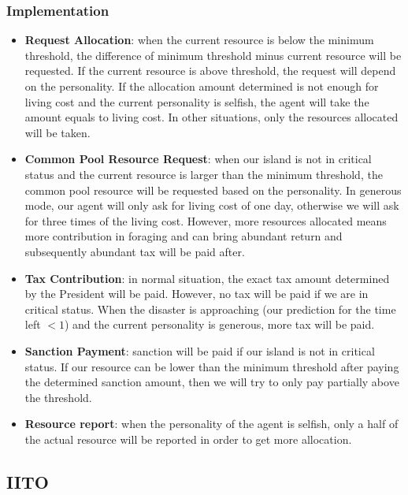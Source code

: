 \subsubsection{Implementation} \label{subsubsec:Team6_IIGO:Implementation}
\begin{itemize}
\item \textbf{Request Allocation}: when the current resource is below the minimum threshold, the difference of minimum threshold minus current resource will be requested. If the current resource is above threshold, the request will depend on the personality. If the allocation amount determined is not enough for living cost and the current personality is selfish, the agent will take the amount equals to living cost. In other situations, only the resources allocated will be taken.
\item \textbf{Common Pool Resource Request}: when our island is not in critical status and the current resource is larger than the minimum threshold, the common pool resource will be requested based on the personality. In generous mode, our agent will only ask for living cost of one day, otherwise we will ask for three times of the living cost. However, more resources allocated means more contribution in foraging and can bring abundant return and subsequently abundant tax will be paid after.
\item \textbf{Tax Contribution}: in normal situation, the exact tax amount determined by the President will be paid. However, no tax will be paid if we are in critical status. When the disaster is approaching (our prediction for the time left $< 1$) and the current personality is generous, more tax will be paid. 
\item \textbf {Sanction Payment}: sanction will be paid if our island is not in critical status. If our resource can be lower than the minimum threshold after paying the determined sanction amount, then we will try to only pay partially above the threshold. 
\item \textbf {Resource report}: when the personality of the agent is selfish, only a half of the actual resource will be reported in order to get more allocation.
\end{itemize}

\subsection{IITO} \label{subsec:Team6_IITO}
